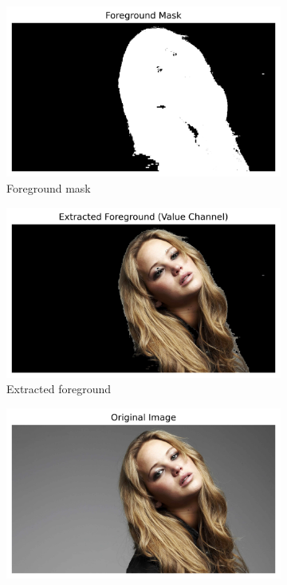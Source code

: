 \documentclass[10pt,a4paper]{article}
\begin{document}
\begin{figure}[H]
    \centering
    \begin{subfigure}{0.24\textwidth}
        \includegraphics[width=\textwidth]{task6/2_mask.png}
        \caption{Foreground mask}
    \end{subfigure}
    \begin{subfigure}{0.24\textwidth}
        \includegraphics[width=\textwidth]{task6/3_foreground.png}
        \caption{Extracted foreground}
    \end{subfigure}
    \begin{subfigure}{0.24\textwidth}
        \includegraphics[width=\textwidth]{task6/4_original.png}

\end{subfigure}
\end{figure}
\end{document}
